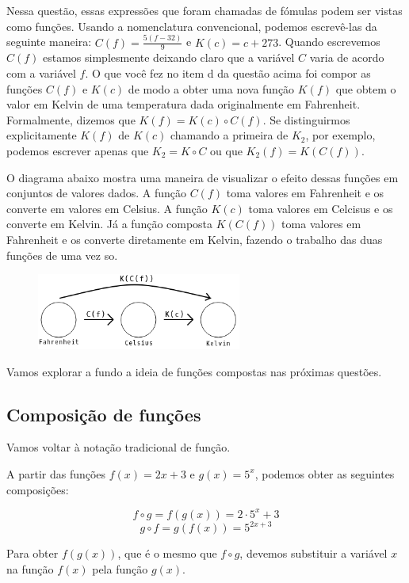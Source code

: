 \documentclass[main.tex]{subfiles}
\begin{document}
Nessa questão, essas expressões que foram chamadas de fómulas podem ser vistas como funções. Usando a nomenclatura convencional, podemos escrevê-las da seguinte maneira: $C(f)=\frac{5(f-32)}{9}$ e $K(c)=c+273$. Quando escrevemos $C(f)$ estamos simplesmente deixando claro que a variável $C$ varia de acordo com a variável $f$. O que você fez no item d da questão acima foi compor as funções $C(f)$ e $K(c)$ de modo a obter uma nova função $K(f)$ que obtem o valor em Kelvin de uma temperatura dada originalmente em Fahrenheit.
Formalmente, dizemos que $K(f) = K(c) \circ C(f)$. Se distinguirmos explicitamente $K(f)$ de $K(c)$ chamando a primeira de $K_2$, por exemplo, podemos escrever apenas que $K_2=K \circ C$ ou que $K_2(f) = K(C(f))$.

O diagrama abaixo mostra uma maneira de visualizar o efeito dessas funções em conjuntos de valores dados. A função $C(f)$ toma valores em Fahrenheit e os converte em valores em Celsius. A função $K(c)$ toma valores em Celcisus e os converte em Kelvin. Já a função composta $K(C(f))$ toma valores em Fahrenheit e os converte diretamente em Kelvin, fazendo o trabalho das duas funções de uma vez so.

\begin{figure}[h]
\centering
\includegraphics[width=0.6\textwidth]{./img/c5q5.png}
\end{figure}

Vamos explorar a fundo a ideia de funções compostas nas próximas questões.

\subsection*{Composição de funções}

Vamos voltar à notação tradicional de função.

\begin{caixaExemplo}
A partir das funções $f(x)=2x+3$ e $g(x)=5^x$, podemos obter as seguintes composições:

$$ f \circ g = f(g(x)) = 2 \cdot 5^x + 3 $$
$$ g \circ f = g(f(x)) = 5^{2x+3}$$
\end{caixaExemplo}

Para obter $f(g(x))$, que é o mesmo que $f \circ g$, devemos substituir a variável $x$ na função $f(x)$ pela função $g(x)$.
\end{document}
